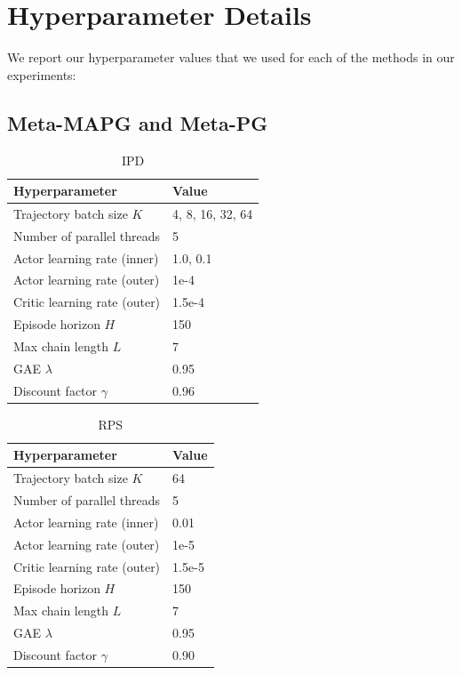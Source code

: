 \section{Hyperparameter Details}\label{sec:hyperparameter-details}
We report our hyperparameter values that we used for each of the methods in our experiments:
\subsection{Meta-MAPG and Meta-PG}
\begin{table}[H]
\centering
\begin{tabular}{l|l}
Hyperparameter & Value \\ \hline
Trajectory batch size $K$ & 4, 8, 16, 32, 64 \\
Number of parallel threads & 5 \\
Actor learning rate (inner) & 1.0, 0.1 \\
Actor learning rate (outer) & 1e-4 \\
Critic learning rate (outer) & 1.5e-4 \\
Episode horizon $H$ & 150 \\
Max chain length $L$ & 7 \\
GAE $\lambda$ & 0.95 \\
Discount factor $\gamma$ & 0.96 \\
\end{tabular}
\caption{IPD}
\end{table}

\begin{table}[H]
\centering
\begin{tabular}{l|l}
Hyperparameter & Value \\ \hline
Trajectory batch size $K$ & 64 \\
Number of parallel threads & 5 \\
Actor learning rate (inner) & 0.01 \\
Actor learning rate (outer) & 1e-5 \\
Critic learning rate (outer) & 1.5e-5 \\
Episode horizon $H$ & 150 \\
Max chain length $L$ & 7 \\
GAE $\lambda$ & 0.95 \\
Discount factor $\gamma$ & 0.90 \\
\end{tabular}
\caption{RPS}
\end{table}

